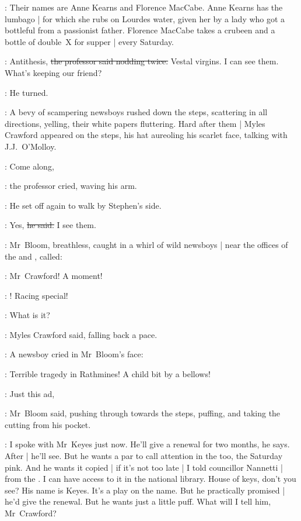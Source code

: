 \Stephen:
Their names are Anne Kearns and Florence MacCabe.
Anne Kearns has the lumbago |
for which she rubs on Lourdes water,
given her by a lady
who got a bottleful from a passionist father.
Florence MacCabe takes a crubeen and a bottle of double~X for supper |
every Saturday.

\machugh:
Antithesis,
\sout{the professor said nodding twice.}
Vestal virgins.
I can see them.
What's keeping our friend?

:
He turned.

:
A bevy of scampering newsboys rushed down the steps,
scattering in all directions, yelling,
their white papers fluttering.
Hard after them |
Myles Crawford appeared on the steps,
his hat aureoling his scarlet face,
talking with J.J.~O'Molloy.

\machugh:
Come along,

:
the professor cried,
waving his arm.

:
He set off again to walk by Stephen's side.



\machugh:
Yes,
\sout{he said.}
I see them.

:
Mr~Bloom,
breathless,
caught in a whirl of wild newsboys |
near the offices of the  and ,
called:

\Bloom:
Mr~Crawford!
A moment!

\boy:
!
Racing special!

\crawford:
What is it?

:
Myles Crawford said,
falling back a pace.

:
A newsboy cried in Mr~Bloom's face:

\boy:
Terrible tragedy in Rathmines!
A child bit by a bellows!



\Bloom:
Just this ad,

:
Mr~Bloom said,
pushing through towards the steps,
puffing,
and taking the cutting from his pocket.

\Bloom:
I spoke with Mr~Keyes just now.
He'll give a renewal for two months, he says.
After |
he'll see.
But he wants a par to call attention in the  too,
the Saturday pink.
And he wants it copied |
if it's not too late |
I told councillor Nannetti |
from the .
I can have access to it in the national library.
House of keys, don't you see?
His name is Keyes.
It's a play on the name.
But he practically promised |
he'd give the renewal.
But he wants
just a little puff.
What will I tell him, Mr~Crawford?


